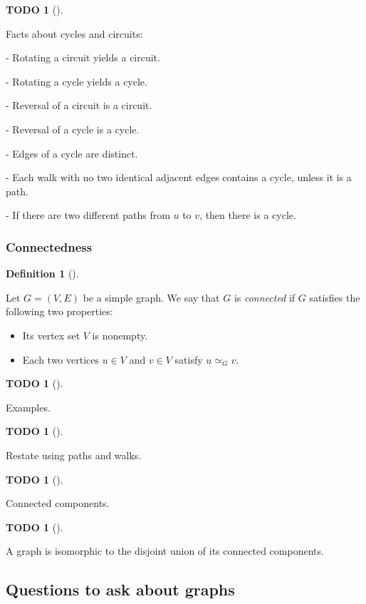 \documentclass[numbers=enddot,12pt,final,onecolumn,notitlepage]{scrartcl}%
\theoremstyle{definition}
\newtheorem{defi}[theo]{Definition}
\newenvironment{definition}[1][]
{\begin{defi}[#1]\begin{leftbar}}
{\end{leftbar}\end{defi}}
\newtheorem{quest}[theo]{TODO}
\newenvironment{todo}[1][]
{\begin{quest}[#1]\begin{leftbar}}
{\end{leftbar}\end{quest}}
\newcommand{\tup}[1]{\left( #1 \right)}
\begin{document}
\begin{todo}
Facts about cycles and circuits:

- Rotating a circuit yields a circuit.

- Rotating a cycle yields a cycle.

- Reversal of a circuit is a circuit.

- Reversal of a cycle is a cycle.

- Edges of a cycle are distinct.

- Each walk with no two identical adjacent edges contains a cycle,
  unless it is a path.

- If there are two different paths from $u$ to $v$, then there is a
  cycle.
\end{todo}

\subsubsection{Connectedness}

\begin{definition}
Let $G = \tup{V, E}$ be a simple graph. We say that $G$ is
\textit{connected} if $G$ satisfies the following two properties:
\begin{itemize}
\item Its vertex set $V$ is nonempty.
\item Each two vertices $u \in V$ and $v \in V$ satisfy
$u \simeq_G v$.
\end{itemize}
\end{definition}

\begin{todo}
Examples.
\end{todo}

\begin{todo}
Restate using paths and walks.
\end{todo}

\begin{todo}
Connected components.
\end{todo}

\begin{todo}
A graph is isomorphic to the disjoint union of its connected
components.
\end{todo}

\subsection{\label{sect.intro.teasers}Questions to ask about graphs}
\end{document}
